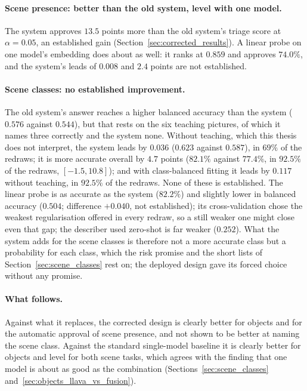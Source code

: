 \paragraph{Scene presence: better than the old system, level with one model.} The system approves $13.5$ points more than the old system's triage score at $\alpha=0.05$, an established gain (Section~\ref{sec:corrected_results}). A linear probe on one model's embedding does about as well: it ranks at $0.859$ and approves $74.0\%$, and the system's leads of $0.008$ and $2.4$ points are not established.

\paragraph{Scene classes: no established improvement.} The old system's answer reaches a higher balanced accuracy than the system ($0.576$ against $0.544$), but that rests on the six teaching pictures, of which it names three correctly and the system none. Without teaching, which this thesis does not interpret, the system leads by $0.036$ ($0.623$ against $0.587$), in $69\%$ of the redraws; it is more accurate overall by $4.7$ points ($82.1\%$ against $77.4\%$, in $92.5\%$ of the redraws, $[-1.5, 10.8]$); and with class-balanced fitting it leads by $0.117$ without teaching, in $92.5\%$ of the redraws. None of these is established. The linear probe is as accurate as the system ($82.2\%$) and slightly lower in balanced accuracy ($0.504$; difference $+0.040$, not established); its cross-validation chose the weakest regularisation offered in every redraw, so a still weaker one might close even that gap; the describer used zero-shot is far weaker ($0.252$). What the system adds for the scene classes is therefore not a more accurate class but a probability for each class, which the risk promise and the short lists of Section~\ref{sec:scene_classes} rest on; the deployed design gave its forced choice without any promise.

\paragraph{What follows.} Against what it replaces, the corrected design is clearly better for objects and for the automatic approval of scene presence, and not shown to be better at naming the scene class. Against the standard single-model baseline it is clearly better for objects and level for both scene tasks, which agrees with the finding that one model is about as good as the combination (Sections~\ref{sec:scene_classes} and~\ref{sec:objects_llava_vs_fusion}).

